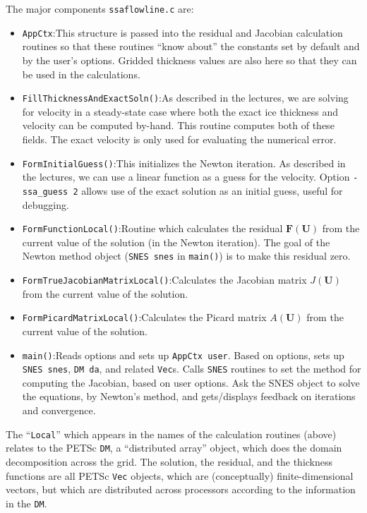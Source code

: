 \documentclass[11pt,final,reqno]{amsart}
\newcommand{\bbF}{\mathbf{F}}
\newcommand{\bU}{\mathbf{U}}
\begin{document}
The major components \texttt{ssaflowline.c} are:
\begin{itemize}
\item \texttt{AppCtx}:\quad This structure is passed into the residual and Jacobian calculation routines so that these routines ``know about'' the constants set by default and by the user's options.  Gridded thickness values are also here so that they can be used in the calculations.
\item \texttt{FillThicknessAndExactSoln()}:\quad As described in the lectures, we are solving for velocity in a steady-state case where both the exact ice thickness and velocity can be computed by-hand.  This routine computes both of these fields.  The exact velocity is only used for evaluating the numerical error.
\item \texttt{FormInitialGuess()}:\quad This initializes the Newton iteration.  As described in the lectures, we can use a linear function as a guess for the velocity.  Option \texttt{-ssa\_guess 2} allows use of the exact solution as an initial guess, useful for debugging.
\item \texttt{FormFunctionLocal()}:\quad  Routine which calculates the residual $\bbF(\bU)$ from the current value of the solution  (in the Newton iteration).  The goal of the Newton method object (\texttt{SNES snes} in \texttt{main()}) is to make this residual zero.
\item \texttt{FormTrueJacobianMatrixLocal()}:\quad Calculates the Jacobian matrix $J(\bU)$ from the current value of the solution.
\item \texttt{FormPicardMatrixLocal()}:\quad Calculates the Picard matrix $A(\bU)$ from the current value of the solution.
\item \texttt{main()}:\quad  Reads options and sets up \texttt{AppCtx user}.  Based on options, sets up \texttt{SNES snes}, \texttt{DM da}, and related \texttt{Vec}s.  Calls \texttt{SNES} routines to set the method for computing the Jacobian, based on user options.  Ask the SNES object to solve the equations, by Newton's method, and gets/displays feedback on iterations and convergence.
\end{itemize}

The ``\texttt{Local}'' which appears in the names of the calculation routines (above) relates to the PETSc \texttt{DM}, a ``distributed array'' object, which does the domain decomposition across the grid.  The solution, the residual, and the thickness functions are all PETSc \texttt{Vec} objects, which are (conceptually) finite-dimensional vectors, but which are distributed across processors according to the information in the \texttt{DM}.
\end{document}
